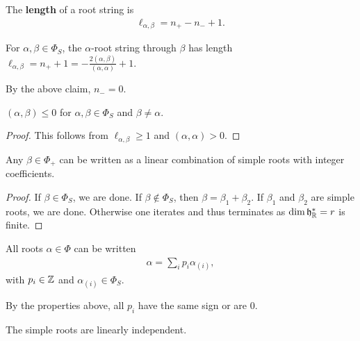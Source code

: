 \begin{definition}
    The \textbf{length} of a root string is
    \begin{align}
        \ell_{\alpha, \beta} = n_{+} - n_- + 1
    .\end{align}
\end{definition}

For $\alpha, \beta \in \Phi_S$, the $\alpha$-root string through $\beta$ has length $\ell_{\alpha, \beta} = n_+ + 1 = -\frac{2 \left( \alpha, \beta \right) }{\left( \alpha, \alpha \right) } + 1$.

By the above claim, $n_- = 0$.

\begin{claim}
    $\left( \alpha, \beta \right) \leq 0$ for $\alpha , \beta \in \Phi_S$ and $\beta \neq \alpha$.
\end{claim}
\begin{proof}
    This follows from $\ell_{\alpha, \beta} \geq 1$ and $\left( \alpha, \alpha \right)  > 0$.
\end{proof}


\begin{claim}
    Any $\beta \in \Phi_+$ can be written as a linear combination of simple roots with integer coefficients.
\end{claim}

\begin{proof}
    If $\beta \in \Phi_S$, we are done. If $\beta \notin \Phi_S$, then $\beta = \beta_1 + \beta_2$. If $\beta_1$ and $\beta_2$ are simple roots, we are done. Otherwise one iterates and thus terminates as $\dim \mathfrak{h}^{*}_{\mathbb{R}} = r$ is finite.
\end{proof}

\begin{claim}
    All roots $\alpha \in \Phi$ can be written
    \begin{align}
        \alpha = \sum_{i}^{}  p_i \alpha_{\left( i \right) }
    ,\end{align}
    with $p_{i} \in \mathbb{Z}$ and $\alpha_{\left( i \right) } \in \Phi_{S}$.
\end{claim}

By the properties above, all $p_i$ have the same sign or are 0.

\begin{claim}
    The simple roots are linearly independent.
\end{claim}



